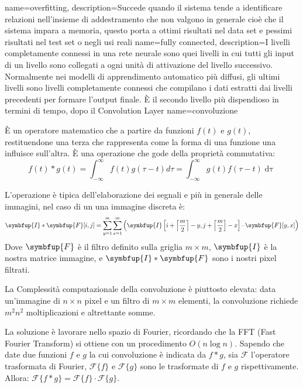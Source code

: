 {
    name=overfitting,
    description={Succede quando il sistema tende a identificare relazioni nell’insieme di addestramento che non valgono in generale cioè che il sistema impara a memoria, questo porta a ottimi risultati nel data set e pessimi risultati nel test set o negli usi reali}
}
{
    name={fully connected},
    description={I livelli completamente connessi in una rete neurale sono quei livelli in cui tutti gli input di
            un livello sono collegati a ogni unità di attivazione del livello successivo. Normalmente nei modelli di
            apprendimento automatico più diffusi, gli ultimi livelli sono livelli completamente connessi
            che compilano i dati estratti dai livelli precedenti per formare l’output finale. È il secondo
            livello più dispendioso in termini di tempo, dopo il \gls{Convolution Layer}}
}
{
    name=convoluzione}{
    È un operatore matematico che a partire da funzioni \(f(t)\) e \(g(t)\), restituendone una terza che rappresenta come la forma di una funzione una influisce sull’altra. È una operazione che gode della proprietà commutativa:
    \[ f ( t ) * g ( t ) = \int _ { - \infty } ^ { \infty } f ( t ) g ( \tau - t ) d \tau  = \int _ { - \infty } ^ { \infty } g ( t ) f ( \tau - t ) \mathop{\mathrm{d} \tau}\]

    L'operazione è tipica dell'elaborazione dei segnali e più in generale delle immagini,  nel caso di un una immagine discreta è:\[ \symbfup { I } * \symbfup{F} [ i , j ] = \sum _ { y = 1 } ^ { m } \sum _ { x = 1 } ^ { m } \left( \symbfup { I } \left[ i + \left\lceil \frac { m } { 2 } \right\rceil - y , j + \left\lceil \frac { m } { 2 } \right] - x \right] \cdot \symbfup { F } [ y , x ] \right) \]
    Dove \(\symbfup{F}\) è il filtro definito sulla griglia \(m \times m\), \(\symbfup{I}\) è la nostra matrice immagine, e \(\symbfup { I } * \symbfup{F}\) sono i nostri pixel filtrati.

    La Complessità
    computazionale  della convoluzione è
    piuttosto elevata: data
    un’immagine di \(n\times n\)
    pixel e un filtro di
    \(m\times m\)
    elementi, la
    convoluzione
    richiede \(m^2 n^2\)
    moltiplicazioni e
    altrettante somme.

    La soluzione è lavorare nello spazio di Fourier, ricordando che la FFT (Fast Fourier Transform) si ottiene con un procedimento \(O(n \log n)\). Sapendo che date due funzioni  \( f \) e \( g \) la cui convoluzione è indicata da \( f * g \), sia \( \mathcal { F } \) l'operatore trasformata di Fourier,  \( \mathcal { F } \{ f \} \) e \( \mathcal { F } \{ g \} \) sono le trasformate di \( f \) e \( g \) rispettivamente. Allora:
    \( \mathcal { F } \{ f * g \} = \mathcal { F } \{ f \} \cdot \mathcal { F } \{ g \} \).}


